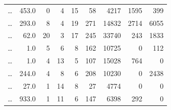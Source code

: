 \documentclass[a4paper,12pt,openany,oneside]{book}
\begin{document}
\begin{table}[ht]
\begin{tabularx}{0.855\textwidth}{rrrrrrrrr}
                \dots &  453.0   &   0   &    4   &    15    &     58    &     4217     &     1595       &    399  \\
                \dots &  293.0   &   8   &    4   &    19    &    271    &    14832     &     2714       &   6055  \\
                \dots &  62.0   &  20   &    3   &    17    &    245    &    33740     &      243       &   1833  \\
                \dots &  1.0   &   5   &    6   &     8    &    162    &    10725     &        0       &    112  \\
                \dots &  1.0   &   4   &   13   &     5    &    107    &    15028     &      764       &      0  \\
                \dots &  244.0   &   4   &    8   &     6    &    208    &    10230     &        0       &   2438  \\
                \dots &  27.0   &   1   &   14   &     8    &     27    &     4774     &        0       &      0  \\
                \dots &  933.0   &   1   &   11   &     6    &    147    &     6398     &      292       &      0  \\
			\end{tabularx}
			\label{table:matches}
\end{table}
\end{document}
